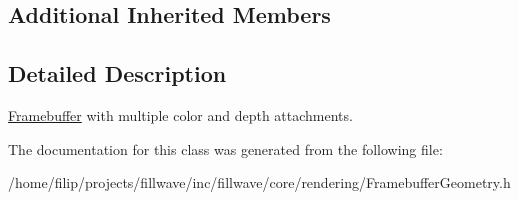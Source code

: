 \subsection*{Additional Inherited Members}


\subsection{Detailed Description}
\hyperlink{classflw_1_1flc_1_1Framebuffer}{Framebuffer} with multiple color and depth attachments. 

The documentation for this class was generated from the following file\+:\begin{DoxyCompactItemize}
\item 
/home/filip/projects/fillwave/inc/fillwave/core/rendering/Framebuffer\+Geometry.\+h\end{DoxyCompactItemize}
